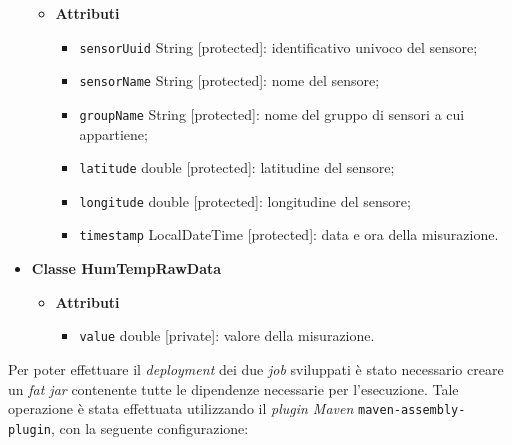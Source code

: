 \begin{itemize}
\begin{itemize}
		      \item \textbf{Attributi}
		            \begin{itemize}
			            \item \texttt{sensorUuid} String [protected]: identificativo univoco del sensore;
			            \item \texttt{sensorName} String [protected]: nome del sensore;
			            \item \texttt{groupName} String [protected]: nome del gruppo di sensori a cui appartiene;
			            \item \texttt{latitude} double [protected]: latitudine del sensore;
			            \item \texttt{longitude} double [protected]: longitudine del sensore;
			            \item \texttt{timestamp} LocalDateTime [protected]: data e ora della misurazione.
		            \end{itemize}
	      \end{itemize}
	\item \textbf{Classe HumTempRawData}
	      \begin{itemize}
		      \item \textbf{Attributi}
		            \begin{itemize}
			            \item \texttt{value} double [private]: valore della misurazione.
		            \end{itemize}
	      \end{itemize}
\end{itemize}

Per poter effettuare il \textit{deployment} dei due \textit{job} sviluppati è stato necessario creare un \textit{fat jar} contenente tutte le dipendenze necessarie per l'esecuzione.
Tale operazione è stata effettuata utilizzando il \textit{plugin Maven} \texttt{maven-assembly-plugin}, con la seguente configurazione:

